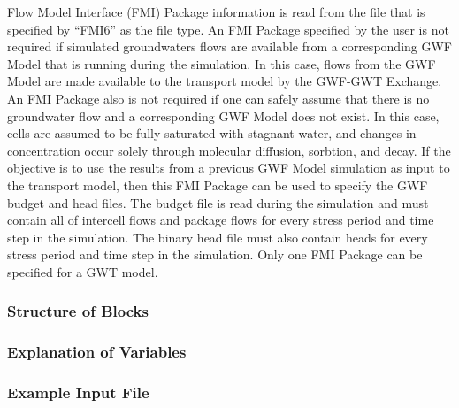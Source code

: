 Flow Model Interface (FMI) Package information is read from the file that is specified by ``FMI6'' as the file type.  An FMI Package specified by the user is not required if simulated groundwaters flows are available from a corresponding GWF Model that is running during the simulation.  In this case, flows from the GWF Model are made available to the transport model by the GWF-GWT Exchange.  An FMI Package also is not required if one can safely assume that there is no groundwater flow and a corresponding GWF Model does not exist.  In this case, cells are assumed to be fully saturated with stagnant water, and changes in concentration occur solely through molecular diffusion, sorbtion, and decay.  If the objective is to use the results from a previous GWF Model simulation as input to the transport model, then this FMI Package can be used to specify the GWF budget and head files.  The budget file is read during the simulation and must contain all of intercell flows and package flows for every stress period and time step in the simulation.  The binary head file must also contain heads for every stress period and time step in the simulation.  Only one FMI Package can be specified for a GWT model. 

\vspace{5mm}
\subsubsection{Structure of Blocks}


\vspace{5mm}
\subsubsection{Explanation of Variables}
\begin{description}

\end{description}

\vspace{5mm}
\subsubsection{Example Input File}


